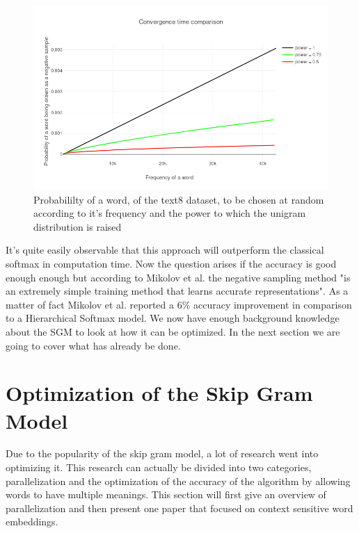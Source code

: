{\begin{figure}[ht]
    \centering
			\includegraphics[scale=0.45]{images/frequency_ex} 
    \caption{Probabililty of a word, of the text8 dataset,  to be chosen at random according to it's frequency and the power to which the unigram distribution is raised}
    \label{fig:frequency_ex}
\end{figure}

It's quite easily observable that this approach will outperform the classical softmax in computation time. Now the question arises if the accuracy is good enough enough but according to Mikolov et al. \cite{mikolov2} the negative sampling method "is an extremely simple training method that learns accurate representations". As a matter of fact Mikolov et al. \cite{mikolov2} reported a 6\% accuracy improvement in comparison to a Hierarchical Softmax model.
We now have enough background knowledge about the SGM to look at how it can be optimized. In the next section we are going to cover what has already be done.

\section{Optimization of the Skip Gram Model}
Due to the popularity of the skip gram model, a lot of research went into optimizing it. This research can actually be divided into two categories, parallelization and the optimization of the accuracy of the algorithm by allowing words to have multiple meanings. This section will first give an overview of parallelization and then present one paper that focused on context sensitive word embeddings. 

}
